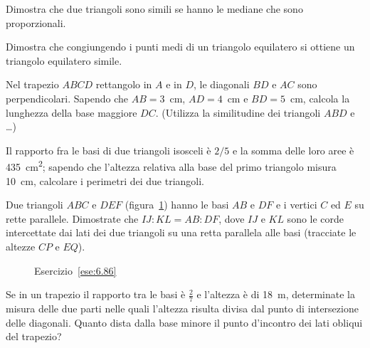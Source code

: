 \begin{multicols}{2}
\begin{esercizio}
\label{ese:6.82}
Dimostra che due triangoli sono simili se hanno le mediane che sono 
proporzionali.
\end{esercizio}

\begin{esercizio}
\label{ese:6.83}
Dimostra che congiungendo i punti medi di un triangolo equilatero si 
ottiene un triangolo equilatero simile.
\end{esercizio}

\begin{esercizio}
\label{ese:6.84}
Nel trapezio $ABCD$ rettangolo in $A$ e in $D$, le diagonali $BD$ e 
$AC$ sono perpendicolari. Sapendo che $AB=3$~cm, $AD=4$~cm e 
$BD=5$~cm, calcola la lunghezza della base maggiore $DC$. (Utilizza 
la similitudine dei triangoli $ABD$ e \ldots{})
\end{esercizio}

\begin{esercizio}
\label{ese:6.85}
Il rapporto fra le basi di due triangoli isosceli è $2/5$ e la somma 
delle loro aree è 435~cm\textsuperscript{2}; sapendo che l'altezza 
relativa alla base del primo triangolo misura 10~cm, calcolare i 
perimetri dei due triangoli. 
\end{esercizio}

\begin{esercizio}
\label{ese:6.86}
Due triangoli $ABC$ e $DEF$ (figura~\ref{fig:ese6.86}) hanno le basi 
$AB$ e $DF$ e i vertici $C$ ed $E$ su rette parallele. Dimostrate che 
$IJ:KL=AB:DF$, dove $IJ$ e $KL$ sono le corde intercettate dai lati 
dei due triangoli su una retta parallela alle basi (tracciate le 
altezze $CP$ e $EQ$).
\end{esercizio}


\begin{inaccessibleblock}
 \begin{figure}[!htb]
	\centering
	\caption{Esercizio~\ref{ese:6.86}}\label{fig:ese6.86}
\end{figure}
\end{inaccessibleblock}

\begin{esercizio}
\label{ese:6.87}
Se in un trapezio il rapporto tra le basi è $\frac{2}{7}$ e l'altezza 
è di 18~m, determinate la misura delle due parti nelle quali 
l'altezza risulta divisa dal punto di intersezione delle diagonali. 
Quanto dista dalla base minore il punto d'incontro dei lati obliqui 
del trapezio?
\end{esercizio}


\end{multicols}
